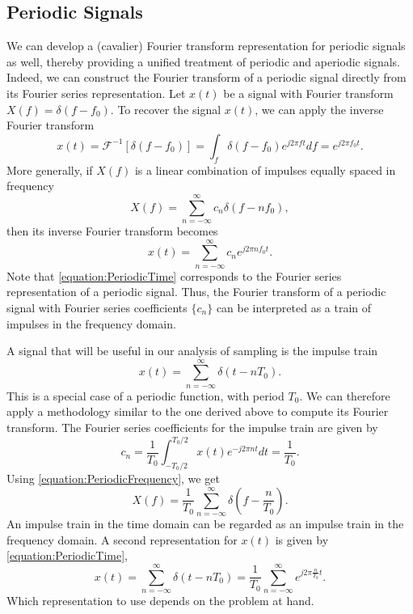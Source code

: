 \subsection{Periodic Signals}

We can develop a (cavalier) Fourier transform representation for periodic signals as well, thereby providing a unified treatment of periodic and aperiodic signals. 
Indeed, we can construct the Fourier transform of a periodic signal directly from its Fourier series representation.
Let $x(t)$ be a signal with Fourier transform $X(f) = \delta(f - f_0)$.
To recover the signal $x(t)$, we can apply the inverse Fourier transform
\begin{equation*}
x(t) = \mathcal{F}^{-1} [ \delta (f - f_0) ]
=\int_f \delta(f - f_0) e^{j 2 \pi ft} df
= e^{j 2 \pi f_0 t}.
\end{equation*}
More generally, if $X(f)$ is a linear combination of impulses equally spaced in frequency
\begin{equation} \label{equation:PeriodicFrequency}
X(f) = \sum_{n = -\infty}^{\infty} c_n \delta (f - n f_0) ,
\end{equation}
then its inverse Fourier transform becomes
\begin{equation} \label{equation:PeriodicTime}
x(t) = \sum_{n = -\infty}^{\infty} c_n e^{j 2 \pi n f_0 t} .
\end{equation}
Note that \eqref{equation:PeriodicTime} corresponds to the Fourier series representation of a periodic signal.
Thus, the Fourier transform of a periodic signal with Fourier series coefficients $\{ c_n \}$ can be interpreted as a train of impulses in the frequency domain.

A signal that will be useful in our analysis of sampling is the impulse train
\begin{equation*}
x(t) = \sum_{n = -\infty}^{\infty} \delta(t - nT_0) .
\end{equation*}
This is a special case of a periodic function, with period $T_0$.
We can therefore apply a methodology similar to the one derived above to compute its Fourier transform.
The Fourier series coefficients for the impulse train are given by
\begin{equation*}
c_n = \frac{1}{T_0} \int_{-T_0/2}^{T_0/2} x(t) e^{- j 2 \pi n t} dt
= \frac{1}{T_0} .
\end{equation*}
Using \eqref{equation:PeriodicFrequency}, we get
\begin{equation} \label{equation:ImpulseTrainFrequency}
X(f) = \frac{1}{T_0} \sum_{n = -\infty}^{\infty} \delta \left( f - \frac{n}{T_0} \right) .
\end{equation}
An impulse train in the time domain can be regarded as an impulse train in the frequency domain.
A second representation for $x(t)$ is given by \eqref{equation:PeriodicTime},
\begin{equation} \label{equation:ImpulseTrainTime}
x(t) = \sum_{n = -\infty}^{\infty} \delta(t - nT_0)
= \frac{1}{T_0} \sum_{n = -\infty}^{\infty} e^{j 2 \pi \frac{n}{T_0} t} .
\end{equation}
Which representation to use depends on the problem at hand.


